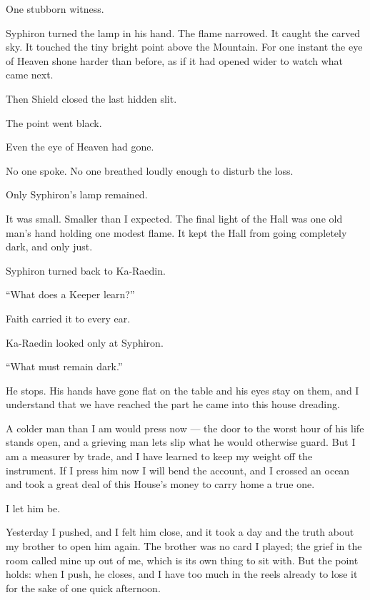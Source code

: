 One stubborn witness.\par
Syphiron turned the lamp in his hand.
The flame narrowed.
It caught the carved sky.
It touched the tiny bright point above the Mountain.
For one instant the eye of Heaven shone harder than before, as if it had opened wider to watch what came next.\par
Then Shield closed the last hidden slit.\par
The point went black.\par
Even the eye of Heaven had gone.\par
No one spoke.
No one breathed loudly enough to disturb the loss.\par
Only Syphiron's lamp remained.\par
It was small.
Smaller than I expected.
The final light of the Hall was one old man's hand holding one modest flame.
It kept the Hall from going completely dark, and only just.\par
Syphiron turned back to Ka-Raedin.\par
``What does a Keeper learn?''\par
Faith carried it to every ear.\par
Ka-Raedin looked only at Syphiron.\par
``What must remain dark.''\par

\ornament

He stops. His hands have gone flat on the table and his eyes stay on them, and I understand that we have reached the part he came into this house dreading.\par

A colder man than I am would press now --- the door to the worst hour of his life stands open, and a grieving man lets slip what he would otherwise guard. But I am a measurer by trade, and I have learned to keep my weight off the instrument. If I press him now I will bend the account, and I crossed an ocean and took a great deal of this House's money to carry home a true one.\par

I let him be.\par

Yesterday I pushed, and I felt him close, and it took a day and the truth about my brother to open him again. The brother was no card I played; the grief in the room called mine up out of me, which is its own thing to sit with. But the point holds: when I push, he closes, and I have too much in the reels already to lose it for the sake of one quick afternoon.\par

